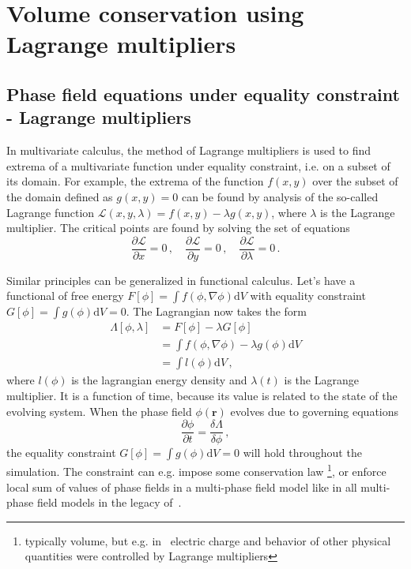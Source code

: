 \chapter{Volume conservation using Lagrange multipliers} \label{ch_lagrange_multipliers_PF}
\section{Phase field equations under equality constraint - Lagrange multipliers} \label{sec_apdx_Lagrmult}
In multivariate calculus, the method of Lagrange multipliers is used to find extrema of a multivariate function under equality constraint, i.e. on a subset of its domain. For example, the extrema of the function $f(x,y)$ over the subset of the domain defined as $g(x,y)=0$ can be found by analysis of the so-called Lagrange function $\mathcal{L}(x,y,\lambda)=f(x,y)-\lambda g(x,y)$, where $\lambda$ is the Lagrange multiplier. The critical points are found by solving the set of equations
\begin{equation}
\frac{\partial \mathcal{L}}{\partial x}=0 \,,\quad \frac{\partial \mathcal{L}}{\partial y}=0 \,,\quad    \frac{\partial \mathcal{L}}{\partial \lambda}=0 \,.
\end{equation}

Similar principles can be generalized in functional calculus. Let's have a functional of free energy $F[\phi] = \int f(\phi,\nabla\phi) \mathrm{d}V$ with equality constraint $G[\phi]=\int g(\phi)\mathrm{d}V=0$. The Lagrangian now takes the form
\begin{align}
\Lambda[\phi,\lambda]&= F[\phi] - \lambda
G[\phi] \\
&= \int f(\phi,\nabla\phi) - \lambda g(\phi)\mathrm{d}V \\
&= \int l(\phi) \mathrm{d}V \,,
\end{align}
where $l(\phi)$ is the lagrangian energy density and $\lambda(t)$ is the Lagrange multiplier. It is a function of time, because its value is related to the state of the evolving system. When the phase field $\phi(\bm{r})$ evolves due to governing equations 
\begin{equation}
\frac{\partial \phi}{\partial t} = \frac{\delta \Lambda}{\delta \phi}\,,
\end{equation}
the equality constraint $G[\phi]=\int g(\phi)\mathrm{d}V=0$ will hold throughout the simulation. The constraint can e.g. impose some conservation law \footnote{typically volume, but e.g. in~\cite{Guyer2004a,Guyer2004b} electric charge and behavior of other physical quantities were controlled by Lagrange multipliers}, or enforce local sum of values of phase fields in a multi-phase field model like in all multi-phase field models in the legacy of~\cite{Steinbach1996}.

